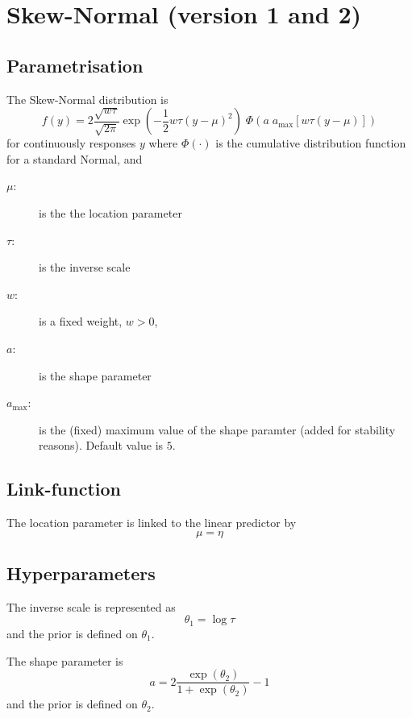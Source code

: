 \documentclass[a4paper,11pt]{article}
\begin{document}
\section*{Skew-Normal (version 1 and 2)}

\subsection*{Parametrisation}

The Skew-Normal distribution is
\begin{displaymath}
    f(y) = 2\frac{\sqrt{w\tau}}{\sqrt{2\pi}} \exp\left( -\frac{1}{2}
      w\tau \left(y-\mu\right)^{2}\right) \;
    \Phi(a\; a_{\text{max}} \left[w\tau \left(y-\mu\right)\right])
\end{displaymath}
for continuously responses $y$ where $\Phi(\cdot)$ is the cumulative
distribution function for a standard Normal, and
\begin{description}
\item[$\mu$:] is the the location parameter
\item[$\tau$:] is the inverse scale
\item[$w$:] is a fixed weight, $w>0$,
\item[$a$:] is the shape parameter
\item[$a_{\text{max}}$:] is the (fixed) maximum value of the shape
    paramter (added for stability reasons). Default value is $5$.
\end{description}

\subsection*{Link-function}

The location parameter is linked to the linear predictor by
\begin{displaymath}
    \mu = \eta
\end{displaymath}

\subsection*{Hyperparameters}

The inverse scale is represented as
\begin{displaymath}
    \theta_{1} = \log \tau
\end{displaymath}
and the prior is defined on $\theta_{1}$. 

The shape parameter is 
\begin{displaymath}
    a = 2 \frac{\exp(\theta_{2})}{1+\exp(\theta_{2})}-1
\end{displaymath}
and the prior is defined on $\theta_{2}$. 
\end{document}
